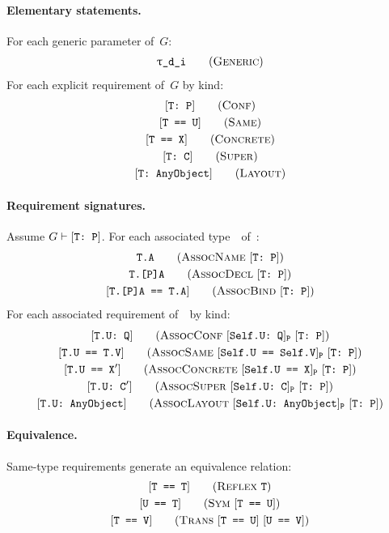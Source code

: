 \documentclass[../generics]{subfiles}
\begin{document}
\paragraph{Elementary statements.}
For each generic parameter  of~$G$:
\begin{gather*}
\GenericStepDef
\end{gather*}
For each explicit requirement of~$G$ by kind:
\begin{gather*}
\ConfStepDef\\
\SameStepDef\\
\ConcreteStepDef\\
\SuperStepDef\\
\LayoutStepDef
\end{gather*}

\paragraph{Requirement signatures.}
Assume $G\vdash[\texttt{T:~P}]$. For each associated type~\nA\ of~\tP:
\begin{gather*}
\AssocNameStepDef\\
\AssocDeclStepDef\\
\AssocBindStepDef
\end{gather*}
For each associated requirement of~\tP\ by kind:
\begin{gather*}
\AssocConfStepDef\\
\AssocSameStepDef\\
\AssocConcreteStepDef\\
\AssocSuperStepDef\\
\AssocLayoutStepDef
\end{gather*}

\paragraph{Equivalence.}
Same-type requirements generate an equivalence relation:
\begin{gather*}
\ReflexStepDef\\
\SymStepDef\\
\TransStepDef
\end{gather*}
\end{document}
